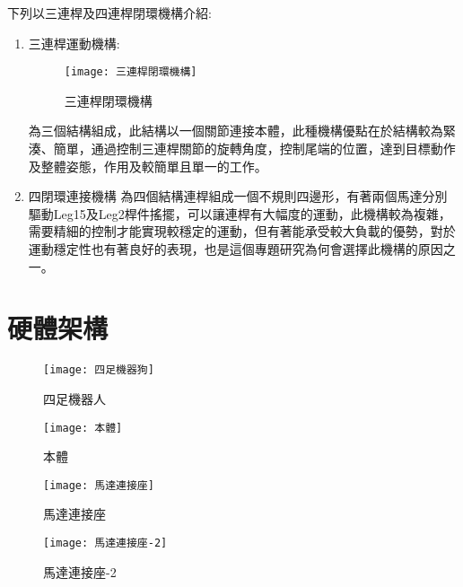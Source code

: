 下列以三連桿及四連桿閉環機構介紹:\\
\begin{enumerate}
\item 三連桿運動機構:

\begin{figure}[hbt!]
\begin{center}
\texttt{[image: 三連桿閉環機構]}
\caption{\Large 三連桿閉環機構}\label{三連桿閉環機構}
\end{center}
\end{figure}

為三個結構組成，此結構以一個關節連接本體，此種機構優點在於結構較為緊湊、簡單，通過控制三連桿關節的旋轉角度，控制尾端的位置，達到目標動作及整體姿態，作用及較簡單且單一的工作。\\
\item 四閉環連接機構
為四個結構連桿組成一個不規則四邊形，有著兩個馬達分別驅動Leg15及Leg2桿件搖擺，可以讓連桿有大幅度的運動，此機構較為複雜，需要精細的控制才能實現較穩定的運動，但有著能承受較大負載的優勢，對於運動穩定性也有著良好的表現，也是這個專題研究為何會選擇此機構的原因之一。
\end{enumerate}
\newpage

\section{硬體架構}

\begin{figure}[hbt!]
\begin{center}
\texttt{[image: 四足機器狗]}
\caption{\Large 四足機器人}\label{四足機器狗}
\end{center}
\end{figure}

\begin{figure}[htbp]

  \begin{minipage}[t]{0.3\linewidth}
    \centering
    \texttt{[image: 本體]}
    \caption{本體}
    \label{本體}
  \end{minipage}
  
  \hfill
  
  \begin{minipage}[t]{0.45\linewidth}
    \centering
    \texttt{[image: 馬達連接座]}
    \caption{馬達連接座}
    \label{馬達連接座}
  \end{minipage}
  \hfill
  \begin{minipage}[t]{0.45\linewidth}
    \centering
    \texttt{[image: 馬達連接座-2]}
    \caption{馬達連接座-2}
    \label{馬達連接座-2}
  \end{minipage}

\end{figure}

